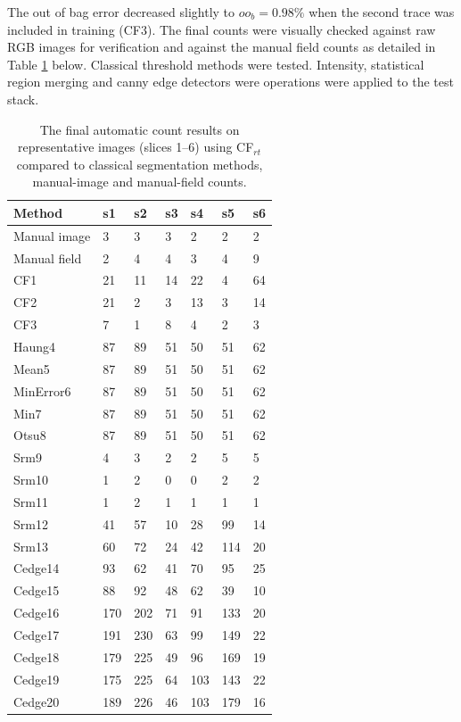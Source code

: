 The out of bag error decreased slightly to $ oo_b= 0.98\%$ when the second trace was included in training (CF3). The final counts were visually checked against raw \ac{RGB} images for verification and against the manual field counts as detailed in Table \ref{tab:test-classifier-results} below. Classical threshold methods were tested. Intensity, statistical region merging and canny edge detectors were operations were applied to the test stack. 

\begin{table}[!htbp]\myfloatalign \caption[Final count results from test classifier CF.]{The final automatic count results  on representative images (slices 1--6) using CF$ _{rt} $ compared to classical segmentation methods, manual-image and manual-field counts.}\label{tab:test-classifier-results} 
\begin{tabular}{lllllll} \toprule
Method &	s1 &	s2 &	s3 &	s4 &	s5 &	s6 \\ \toprule
Manual image &	3 &	3 &	3 &	2 &	2 &	2   \\
Manual field &	2 &	4 &	4 &	3 &	4 &	9 \\
CF1 &	21 &	11 &	14 &	22 &	4 &	64  \\
CF2 &	21 &	2 &	3 &	13 &	3 &	14  \\
CF3 &	7 &	1 &	8 &	4 &	2 &	3 \\
Haung4 &	87 &	89 &	51 &	50 &	51 &	62  \\
Mean5 &	87 &	89 &	51 &	50 &	51 &	62  \\
MinError6 &	87 &	89 &	51 &	50 &	51 &	62  \\
Min7 &	87 &	89 &	51 &	50 &	51 &	62  \\
Otsu8 &	87 &	89 &	51 &	50 &	51 &	62  \\
Srm9 &	4 &	3 &	2 &	2 &	5 &	5  \\
Srm10 &	1 &	2 &	0 &	0 &	2 &	2  \\
Srm11 &	1 &	2 &	1 &	1 &	1 &	1 \\
Srm12 &	41 &	57 &	10 &	28 &	99 &	14  \\
Srm13 &	60 &	72 &	24 &	42 &	114 &	20  \\
Cedge14 &	93 &	62 &	41 &	70 &	95 &	25  \\
Cedge15 &	88 &	92 &	48 &	62 &	39 &	10  \\
Cedge16 &	170 &	202 &	71 &	91 &	133 &	20  \\
Cedge17 &	191 &	230 &	63 &	99 &	149 &	22  \\
Cedge18 &	179 &	225 &	49 &	96 &	169 &	19  \\
Cedge19 &	175 &	225 &	64 &	103 &	143 &	22  \\
Cedge20 &	189 &	226 &	46 &	103 &	179 &	16  \\
\bottomrule
\end{tabular}
\end{table}

